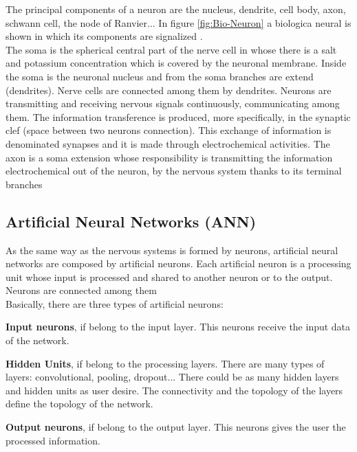 The principal components of a neuron are the nucleus, dendrite, cell body, axon, schwann cell, the node of Ranvier... In figure \ref{fig:Bio-Neuron} a biologica neural is shown in which its components are signalized \cite{BINN}.\\

The soma is the spherical central part of the nerve cell in whose there is a salt and potassium concentration which is covered by the neuronal membrane. Inside the soma is the neuronal nucleus and from the soma branches are extend (dendrites). Nerve cells are connected among them by dendrites. Neurons are transmitting and receiving nervous signals continuously, communicating among them. The information transference is produced, more specifically, in the synaptic clef (space between two neurons connection). This exchange of information is denominated synapses and it is made through electrochemical activities. The axon is a soma extension whose responsibility is transmitting the information electrochemical out of the neuron, by the nervous system thanks to its terminal branches \cite{BINN, neuroscience}\\

\subsection{Artificial Neural Networks (ANN)}
As the same way as the nervous systems is formed by neurons, artificial neural networks are composed by artificial neurons. Each artificial neuron is a processing unit whose input is processed and shared to another neuron or to the output. Neurons are connected among them \cite{BINN}\\

Basically, there are three types of artificial neurons:
\begin{description}[noitemsep,topsep=8pt,parsep=0pt,partopsep=20pt]
\item \textbf{Input neurons}, if belong to the input layer. This neurons receive the input data of the network.
\item \textbf{Hidden Units}, if belong to the processing layers. There are many types of layers: convolutional, pooling, dropout... There could be as many hidden layers and hidden units as user desire. The connectivity and the topology of the layers define the topology of the network.
\item \textbf{Output neurons}, if belong to the output layer. This neurons gives the user the processed information.
\end{description}

